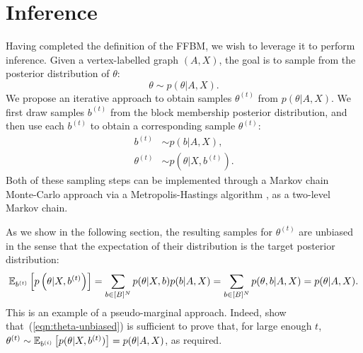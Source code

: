 \section{Inference}
\label{sec:inference}

Having completed the definition of the FFBM, we wish to leverage it 
to perform inference. Given a vertex-labelled graph $(A, X)$,
the goal is to sample from the posterior distribution
of $\theta$:
%
\begin{equation}
	\label{eqn:theta-target}
	\theta \sim p(\theta | A, X).
\end{equation}
%
We propose an iterative approach to obtain samples
$\theta^{(t)}$ from $p(\theta|A,X)$. We first draw samples $b^{(t)}$ 
from the block membership posterior distribution,
and then use each $b^{(t)}$ to obtain a corresponding
sample $\theta^{(t)}$:
%
\begin{align}
	b^{(t)} &\sim p ( b | A, X )  \label{eqn:b-samples},\\
	\theta^{(t)} &\sim p(\theta | X, b^{(t)} ). \label{eqn:theta-samples}
\end{align}
%
Both of these sampling steps can be implemented through a
Markov chain Monte-Carlo approach via a Metropolis-Hastings 
algorithm \cite{hastings-alg}, as a two-level Markov chain.
 
As we show in the following section, the resulting samples 
for $\theta^{(t)}$ are unbiased in the sense that the expectation of 
their distribution is the target posterior distribution:
%
\begin{equation}
\mathbb{E}_{b^{(t)}} \left[p \left( \theta | X, b^{(t)} \right) \right] = \sum_{b \in [B]^N} p(\theta | X, b) p(b | A, X) = \sum_{b \in [B]^N} p(\theta, b | A, X) = p(\theta | A, X).
\label{eqn:theta-unbiased}
\end{equation}
%
This is an example of a pseudo-marginal approach. Indeed, \citet{pseudo-marginal} show that~(\ref{eqn:theta-unbiased})
is sufficient to prove that, for large enough $t$, $\theta^{(t)} \sim \mathbb{E}_{b^{(i)}} \left[ p(\theta | X, b^{(t)})\right] = p(\theta 
| A, X)$, as required.

